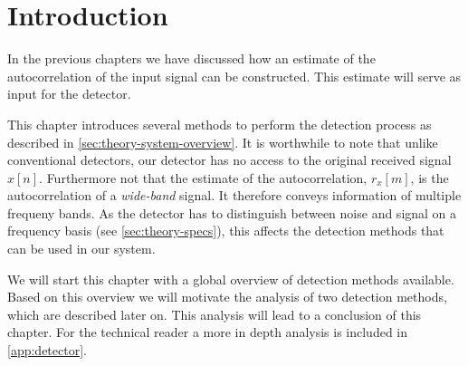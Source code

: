 \documentclass[a4paper, openany, oneside]{memoir}
\begin{document}
\section{Introduction}
In the previous chapters we have discussed how an estimate of the autocorrelation of the input signal can be constructed. This estimate will serve
as input for the detector.

This chapter introduces several methods to perform the detection process as described in \cref{sec:theory-system-overview}. It is worthwhile to note that unlike conventional detectors, our detector has no access to the original received signal $x[n]$. Furthermore not that the estimate of the autocorrelation, $r_x[m]$, is the autocorrelation of a \emph{wide-band} signal. It therefore conveys information of multiple frequeny bands. As the detector has to distinguish between noise and signal on a frequency basis (see \cref{sec:theory-specs}), this affects the detection methods that can be used in our system.  

We will start this chapter with a global overview of detection methods available. Based on this overview we will motivate the analysis of two detection methods, which are described later on. This analysis will lead to a conclusion of this chapter. For the technical reader a more in depth analysis is included in \cref{app:detector}.
\end{document}
